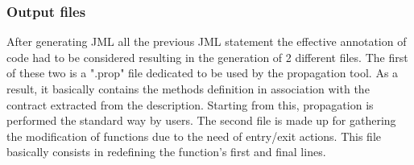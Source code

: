 \subsubsection{Output files}
After generating JML all the previous JML statement the effective annotation of code had to be considered resulting in the generation of 2 different files. The first of these two is a ".prop" file dedicated to be used by the propagation tool. As a result, it basically contains the methods definition in association with the contract  extracted from the description. Starting from this, propagation is performed the standard way by users. The second file is made up for gathering the modification of functions due to the need of entry/exit actions. This file basically consists in redefining the function's first and final lines. 
